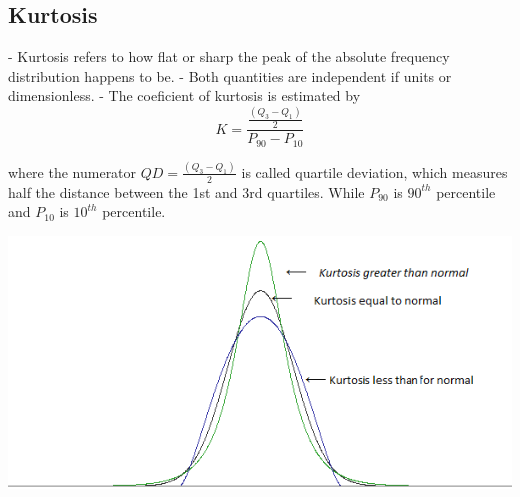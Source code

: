 \documentclass[12pt]{article}
\begin{document}
\subsection{Kurtosis}
- Kurtosis refers to how flat or sharp the peak of the absolute frequency distribution happens to be.
- Both quantities are independent if units or dimensionless.
- The coeficient of kurtosis is estimated by
\begin{equation}
    K = \frac{\frac{(Q_3 - Q_1)}{2} }{P_90 - P_10}
\end{equation}

where the numerator $QD = \frac{(Q_3 - Q_1)}{2}$ is called quartile deviation, which measures half the distance between the 1st and 3rd quartiles. While $P_90$ is $90^{th}$ percentile and $P_10$ is $10^{th}$ percentile.

\hbox{\includegraphics[width=\textwidth]{kurtosis.png}}
\end{document}
